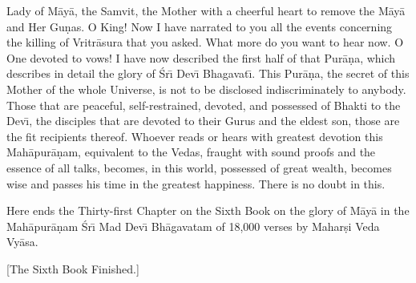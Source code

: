 Lady of M\=ay\=a, the Samvit, the Mother with a cheerful heart to remove the M\=ay\=a and Her Gu\d{n}as. O King! Now I have narrated to you all the events concerning the killing of Vritr\=asura that you asked. What more do you want to hear now. O One devoted to vows! I have now described the first half of that Pur\=a\d{n}a, which describes in detail the glory of \'Sr\={\i} Dev\={\i} Bhagavat\={\i}. This Pur\=a\d{n}a, the secret of this Mother of the whole Universe, is not to be disclosed indiscriminately to anybody. Those that are peaceful, self-restrained, devoted, and possessed of Bhakti to the Dev\={\i}, the disciples that are devoted to their Gurus and the eldest son, those are the fit recipients thereof. Whoever reads or hears with greatest devotion this Mah\=apur\=a\d{n}am, equivalent to the Vedas, fraught with sound proofs and the essence of all talks, becomes, in this world, possessed of great wealth, becomes wise and passes his time in the greatest happiness. There is no doubt in this.

Here ends the Thirty-first Chapter on the Sixth Book on the glory of M\=ay\=a in the Mah\=apur\=a\d{n}am \'Sr\={\i} Mad Dev\={\i} Bh\=agavatam of 18,000 verses by Mahar\d{s}i Veda Vy\=asa.

[The Sixth Book Finished.]



